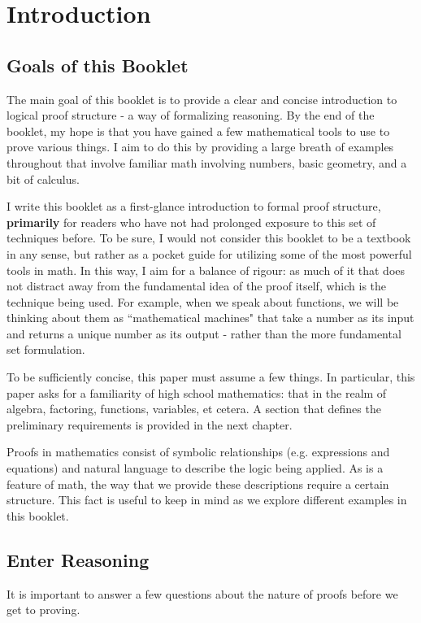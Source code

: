 \documentclass[../proofs.tex]{subfiles}
\begin{document}
\chapter{Introduction}
\section{Goals of this Booklet}
The main goal of this booklet is to provide a clear and concise introduction to
logical proof structure - a way of formalizing reasoning. By the end of the
booklet, my hope is that you have gained a few mathematical tools to use to
prove various things. I aim to do this by providing a large breath of examples
throughout that involve familiar math involving numbers, basic geometry, and a
bit of calculus.

I write this booklet as a first-glance introduction to formal proof structure,
\textbf{primarily} for readers who have not had prolonged exposure to this set
of techniques before. To be sure, I would not consider this booklet to be a
textbook in any sense, but rather as a pocket guide for utilizing some of the
most powerful tools in math. In this way, I aim for a balance of rigour: as
much of it that does not distract away from the fundamental idea of the proof
itself, which is the technique being used. For example, when we speak about
functions, we will be thinking about them as ``mathematical machines" that
take a number as its input and returns a unique number as its output - rather
than the more fundamental set formulation.

To be sufficiently concise, this paper must assume a few things. In particular,
this paper asks for a familiarity of high school mathematics: that in the realm
of algebra, factoring, functions, variables, et cetera. A section that
defines the preliminary requirements is provided in the next chapter.

Proofs in mathematics consist of symbolic relationships (e.g. expressions and
equations) and natural language to describe the logic being applied. As is a
feature of math, the way that we provide these descriptions require a certain
structure. This fact is useful to keep in mind as we explore different examples
in this booklet.

\section{Enter Reasoning}
It is important to answer a few questions about the nature of proofs before we
get to proving.
\end{document}
